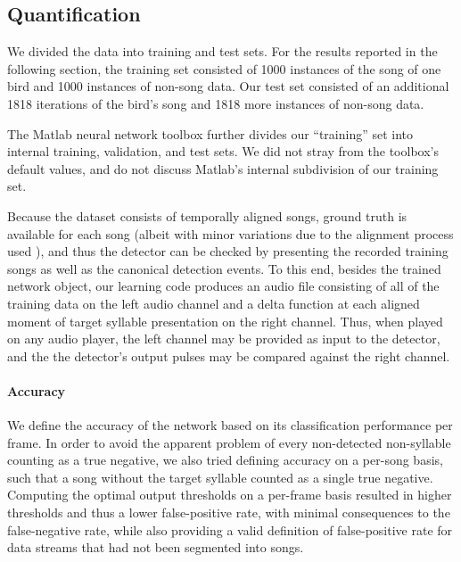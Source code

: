 \documentclass[10pt,letterpaper]{article}
\renewcommand{\subsubsection}[1]{\paragraph{#1}}
\begin{document}
\subsection{Quantification}
\label{sec:quantify}

We divided the data into training and test sets.  For the results reported in the following section, the training set consisted of 1000 instances of the song of one bird and 1000 instances of non-song data.  Our test set consisted of an additional 1818 iterations of the bird's song and 1818 more instances of non-song data.

The Matlab neural network toolbox further divides our ``training'' set into internal training, validation, and test sets.  We did not stray from the toolbox's default values, and do not discuss Matlab's internal subdivision of our training set. %

Because the dataset consists of temporally aligned songs, ground truth is available for each song (albeit with minor variations due to the alignment process used \cite{Poole2012}), and thus the detector can be checked by
presenting the recorded training songs as well as the canonical
detection events. To this end, besides the trained network object, our
learning code produces an audio file consisting of all of the training
data on the left audio channel and a delta function at each aligned moment of
target syllable presentation on the right channel. Thus, when
played on any audio player, the left channel may be provided as input
to the detector, and the the detector's output pulses may be compared against the right channel.


\subsubsection{Accuracy}
\label{sec:accuracy}


We define the accuracy of the network based on its classification performance per frame. In order to avoid the apparent problem of every non-detected non-syllable counting as a true negative, we also tried defining accuracy on a per-song basis, such that a song without the target syllable counted as a single true negative.  Computing the optimal output thresholds on a per-frame basis resulted in higher thresholds and thus a lower false-positive rate, with minimal consequences to the false-negative rate, while also providing a valid definition of false-positive rate for data streams that had not been segmented into songs.
\end{document}
